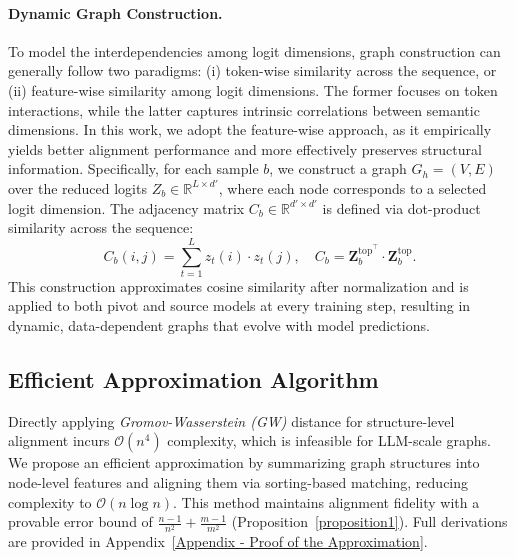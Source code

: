\documentclass{article}
\begin{document}
\paragraph{Dynamic Graph Construction.}
To model the interdependencies among logit dimensions, graph construction can generally follow two paradigms: (i) token-wise similarity across the sequence, or (ii) feature-wise similarity among logit dimensions. The former focuses on token interactions, while the latter captures intrinsic correlations between semantic dimensions. In this work, we adopt the feature-wise approach, as it empirically yields better alignment performance and more effectively preserves structural information. Specifically, for each sample $b$, we construct a graph $G_h = (V, E)$ over the reduced logits $Z_b \in \mathbb{R}^{L \times d'}$, where each node corresponds to a selected logit dimension. The adjacency matrix $C_b \in \mathbb{R}^{d' \times d'}$ is defined via dot-product similarity across the sequence:
\begin{equation}
C_b(i,j) = \sum_{t=1}^{L} z_t(i) \cdot z_t(j), \quad
C_b = \mathbf{Z}_b^{\text{top}^\top} \cdot \mathbf{Z}_b^{\text{top}}.
\end{equation}
This construction approximates cosine similarity after normalization and is applied to both pivot and source models at every training step, resulting in dynamic, data-dependent graphs that evolve with model predictions.

\subsection{Efficient Approximation Algorithm}

Directly applying \textit{Gromov-Wasserstein (GW)} distance for structure-level alignment incurs $\mathcal{O}(n^4)$ complexity, which is infeasible for LLM-scale graphs. We propose an efficient approximation by summarizing graph structures into node-level features and aligning them via sorting-based matching, reducing complexity to $\mathcal{O}(n \log n)$. This method maintains alignment fidelity with a provable error bound of $\frac{n - 1}{n^2} + \frac{m - 1}{m^2}$ (Proposition~\ref{proposition1}). Full derivations are provided in Appendix~\ref{Appendix - Proof of the Approximation}.



\end{document}
